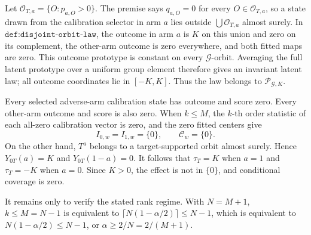 Let \(\mathcal O_{T,a}=\{O:p_{a,O}>0\}\). The premise says \(q_{a,O}=0\) for every \(O\in\mathcal O_{T,a}\), so a state drawn from the calibration selector in arm \(a\) lies outside \(\bigcup\mathcal O_{T,a}\) almost surely. In \(\texttt{def:disjoint-orbit-law}\), the outcome in arm \(a\) is \(K\) on this union and zero on its complement, the other-arm outcome is zero everywhere, and both fitted maps are zero. This outcome prototype is constant on every \(\mathcal G\)-orbit. Averaging the full latent prototype over a uniform group element therefore gives an invariant latent law; all outcome coordinates lie in \([-K,K]\). Thus the law belongs to \(\mathcal P_{\mathcal G,K}\).

Every selected adverse-arm calibration state has outcome and score zero. Every other-arm outcome and score is also zero. When \(k\le M\), the \(k\)-th order statistic of each all-zero calibration vector is zero, and the zero fitted centers give \[I_{0,w}=I_{1,w}=\{0\},\qquad\mathcal C_w=\{0\}.\] On the other hand, \(T^a\) belongs to a target-supported orbit almost surely. Hence \(Y_{0T}(a)=K\) and \(Y_{0T}(1-a)=0\). It follows that \(\tau_T=K\) when \(a=1\) and \(\tau_T=-K\) when \(a=0\). Since \(K>0\), the effect is not in \(\{0\}\), and conditional coverage is zero.

It remains only to verify the stated rank regime. With \(N=M+1\), \(k\le M=N-1\) is equivalent to \(\lceil N(1-\alpha/2)\rceil\le N-1\), which is equivalent to \(N(1-\alpha/2)\le N-1\), or \(\alpha\ge2/N=2/(M+1)\).